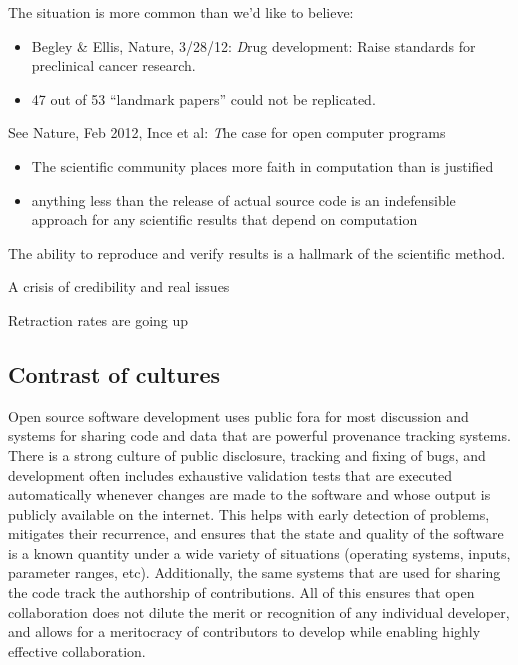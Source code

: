 \documentclass[ChapterTOCs,krantz2]{krantz} %
\begin{document}
The situation is more common than we'd like to believe:
\begin{itemize}
\item Begley \& Ellis, Nature, 3/28/12: {\emph Drug development:
Raise standards for preclinical cancer research.}
\item 47 out of 53 ``landmark papers'' could not be replicated.
\end{itemize}
See Nature, Feb 2012, Ince et al: {\emph The case for open computer programs}
\begin{itemize}
\item The scientific community places more faith in computation
than is justified
\item anything less than the release of actual source code is an
indefensible approach for any scientific results that depend on computation
\end{itemize}


The ability to reproduce and verify results is a hallmark of the
scientific method.

A crisis of credibility and real issues

Retraction rates are going up \cite{cokol2008retraction,steen2011retractions} 
\subsection{Contrast of cultures}

Open source software development uses public fora for most discussion
and systems for sharing code and data that are powerful
provenance tracking systems. There is a strong culture of public disclosure,
tracking and fixing of bugs, and development often includes exhaustive
validation tests that are executed automatically whenever changes
are made to the software and whose output is publicly available on
the internet. This helps with early detection of problems, mitigates
their recurrence, and ensures that the state and quality of the software
is a known quantity under a wide variety of situations (operating
systems, inputs, parameter ranges, etc). Additionally, the same systems
that are used for sharing the code track the authorship of contributions.
All of this ensures that open collaboration does not dilute the merit
or recognition of any individual developer, and allows for a meritocracy
of contributors to develop while enabling highly effective collaboration.
\end{document}
